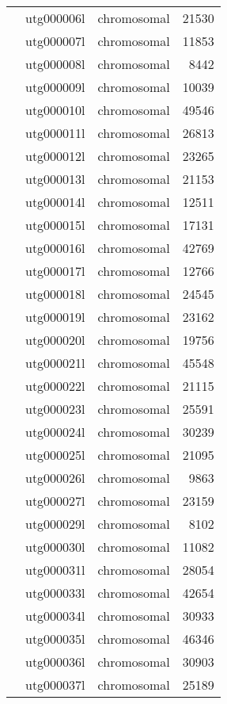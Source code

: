 {\begin{supertabular}{llcr}
          & utg000006l & chromosomal & 21530 \\
          & utg000007l & chromosomal & 11853 \\
          & utg000008l & chromosomal & 8442 \\
          & utg000009l & chromosomal & 10039 \\
          & utg000010l & chromosomal & 49546 \\
          & utg000011l & chromosomal & 26813 \\
          & utg000012l & chromosomal & 23265 \\
          & utg000013l & chromosomal & 21153 \\
          & utg000014l & chromosomal & 12511 \\
          & utg000015l & chromosomal & 17131 \\
          & utg000016l & chromosomal & 42769 \\
          & utg000017l & chromosomal & 12766 \\
          & utg000018l & chromosomal & 24545 \\
          & utg000019l & chromosomal & 23162 \\
          & utg000020l & chromosomal & 19756 \\
          & utg000021l & chromosomal & 45548 \\
          & utg000022l & chromosomal & 21115 \\
          & utg000023l & chromosomal & 25591 \\
          & utg000024l & chromosomal & 30239 \\
          & utg000025l & chromosomal & 21095 \\
          & utg000026l & chromosomal & 9863 \\
          & utg000027l & chromosomal & 23159 \\
          & utg000029l & chromosomal & 8102 \\
          & utg000030l & chromosomal & 11082 \\
          & utg000031l & chromosomal & 28054 \\
          & utg000033l & chromosomal & 42654 \\
          & utg000034l & chromosomal & 30933 \\
          & utg000035l & chromosomal & 46346 \\
          & utg000036l & chromosomal & 30903 \\
          & utg000037l & chromosomal & 25189 \\

\end{supertabular}}
